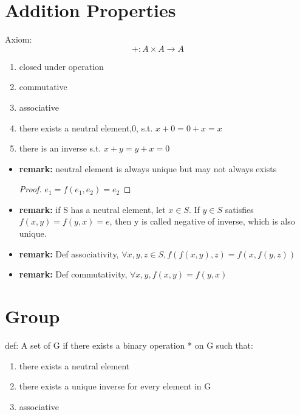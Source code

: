 \documentclass{article}
\begin{document}
    \section{Addition Properties}
        Axiom: \[+ : A \times A \rightarrow A\]
        \begin{enumerate}
            \item closed under operation
            \item commutative
            \item associative
            \item there exists a neutral element,0, s.t. \(x + 0 = 0 + x = x\)
            \item there is an inverse s.t. \(x + y = y + x = 0\) 
        \end{enumerate}
        \begin{itemize}
            \item \textbf{remark:}
            neutral element is always unique but may not always exists
                \begin{proof}
                    \(e_1 = f(e_1,e_2) = e_2\)
                \end{proof}
            
                \item \textbf{remark:}
            if S has a neutral element, let \(x \in S\). If \(y \in S\) satisfies 
            \(f(x,y)=f(y,x)=e\), then y is called negative of inverse, which is also unique.
            
            \item \textbf{remark:}
            Def associativity, \(\forall x,y,z \in S, f(f(x,y),z) = f(x,f(y,z))\)
                
            \item  \textbf{remark:}
            Def commutativity, \(\forall x,y, f(x,y) = f(y,x)\)
        \end{itemize}
        
    \section{Group}
        def: A set of G if there exists a binary operation * on G such that:
        \begin{enumerate}
            \item there exists a neutral element
            \item there exists a unique inverse for every element in G
            \item associative
        \end{enumerate}
    
\end{document}
